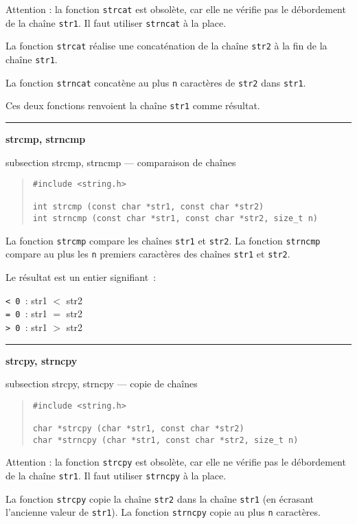\documentclass [twoside] {report}
\newcommand {\primitive} [1]
    {
	{\large \bf #1}
	\addcontentsline {toc} {subsection} {#1}
    }
\newcommand {\separation}
    {
	\vspace {7mm}
	\nopagebreak
	\hrule
    }
\begin{document}
Attention : la fonction \texttt {strcat} est obsolète, car elle ne
vérifie pas le débordement de la chaîne \texttt {str1}. Il faut
utiliser \texttt {strncat} à la place.

La fonction {\tt strcat} réalise une concaténation de la
chaîne {\tt str2} à la fin de la chaîne {\tt str1}.

La fonction {\tt strncat} concatène au plus {\tt n} caractères
de {\tt str2} dans {\tt str1}.

Ces deux fonctions renvoient la chaîne {\tt str1} comme
résultat.


\separation 
\primitive {strcmp, strncmp} --- comparaison de chaînes

\begin {quote}
\begin {verbatim}
#include <string.h>

int strcmp (const char *str1, const char *str2)
int strncmp (const char *str1, const char *str2, size_t n)
\end{verbatim}
\end {quote}

La fonction {\tt strcmp} compare les chaînes {\tt str1} et
{\tt str2}. La fonction {\tt strncmp} compare au plus les {\tt n}
premiers caractères des chaînes {\tt str1} et {\tt str2}.

Le résultat est un entier signifiant~:

{\tt < 0 }: str1 $<$ str2 \\
{\tt = 0 }: str1 $=$ str2 \\
{\tt > 0 }: str1 $>$ str2 


\separation 
\primitive {strcpy, strncpy} --- copie de chaînes

\begin {quote}
\begin {verbatim}
#include <string.h>

char *strcpy (char *str1, const char *str2)
char *strncpy (char *str1, const char *str2, size_t n)
\end{verbatim}
\end {quote}

Attention : la fonction \texttt {strcpy} est obsolète, car elle ne
vérifie pas le débordement de la chaîne \texttt {str1}. Il faut
utiliser \texttt {strncpy} à la place.

La fonction {\tt strcpy} copie la chaîne {\tt str2} dans la
chaîne {\tt str1} (en écrasant l'ancienne valeur de {\tt str1}).
La fonction {\tt strncpy} copie au plus {\tt n} caractères.
\end{document}
